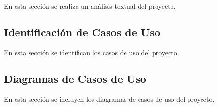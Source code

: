 En esta sección se realiza un análisis textual del proyecto.

\subsection{\textbf{Identificación de Casos de Uso}}

En esta sección se identifican los casos de uso del proyecto.

\subsection{\textbf{Diagramas de Casos de Uso}}

En esta sección se incluyen los diagramas de casos de uso del proyecto.



